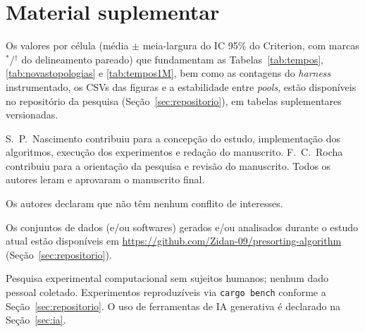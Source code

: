 \documentclass[portuguese]{sbc2025}%
\begin{document}
\appendix
\section{Material suplementar}

Os valores por célula (média $\pm$ meia-largura do IC 95\% do Criterion, com marcas $^{*}$/$^{\dagger}$ do delineamento pareado) que fundamentam as Tabelas~\ref{tab:tempos}, \ref{tab:novastopologias} e \ref{tab:tempos1M}, bem como as contagens do \emph{harness} instrumentado, os CSVs das figuras e a estabilidade entre \emph{pools}, estão disponíveis no repositório da pesquisa (Seção~\ref{sec:repositorio}), em tabelas suplementares versionadas.

\begin{declarations}

\begin{contributions}
S.\ P.\ Nascimento contribuiu para a concepção do estudo, implementação dos algoritmos, execução dos experimentos e redação do manuscrito. F.\ C.\ Rocha contribuiu para a orientação da pesquisa e revisão do manuscrito. Todos os autores leram e aprovaram o manuscrito final.
\end{contributions}

\begin{interests}
Os autores declaram que não têm nenhum conflito de interesses.
\end{interests}

\begin{materials}
Os conjuntos de dados (e/ou softwares) gerados e/ou analisados durante o estudo atual estão disponíveis em \url{https://github.com/Zidan-09/presorting-algorithm} (Seção~\ref{sec:repositorio}).
\end{materials}

\begin{furtherinformation}
Pesquisa experimental computacional sem sujeitos humanos; nenhum dado pessoal coletado. Experimentos reproduzíveis via \texttt{cargo bench} conforme a Seção~\ref{sec:repositorio}. O uso de ferramentas de IA generativa é declarado na Seção~\ref{sec:ia}.
\end{furtherinformation}
\end{declarations}


\renewcommand*{\bibfont}{\small}

\end{document}
